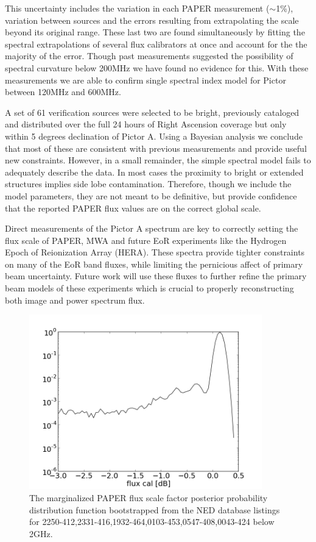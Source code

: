 \documentclass[preprint]{aastex}
\begin{document}
This uncertainty includes the 
variation in each PAPER measurement ($\sim$1\%), variation between sources and the errors resulting
from extrapolating the \citet{Baars:1977p9678} scale beyond its original range. These last
two are found simultaneously by fitting the spectral extrapolations of several flux calibrators
at once and account for the the majority of the error. Though past measurements suggested the possibility
of spectral curvature below 200MHz we have found no evidence for this.  With these measurements we are able 
to confirm single spectral index model for Pictor between 120MHz and 600MHz.

A set of  61 verification sources were selected to be bright, previously cataloged
and  distributed over
the full 24 hours of Right Ascension coverage but only within 5 degrees
declination of Pictor A.  Using a Bayesian analysis we conclude that most of
these are consistent with previous measurements and provide useful new
constraints. However, in a small remainder, the simple spectral model fails to
adequately describe the data. In most cases the proximity to bright or extended
structures implies side lobe contamination.  Therefore, though we include the
model parameters, they are not meant to be definitive, but provide confidence
that the reported PAPER flux values are on the correct global scale.


Direct measurements of the Pictor A spectrum are key to correctly setting the
flux scale of PAPER, MWA and future EoR experiments like the Hydrogen Epoch of Reionization Array (HERA).
These spectra provide tighter constraints on many of the EoR band fluxes, while
limiting the pernicious affect of primary beam uncertainty.  Future work will use these
fluxes to further  refine the primary beam models of these experiments which is crucial to properly reconstructing
both image and power spectrum flux.


\begin{figure}
\centering
\includegraphics[width=0.9\textwidth]{plots/2250-412_2331-416_1932-464_0103-453_0547-408_0043-424_gain_mcmc_chain_gain_conf.png}
\caption{
The marginalized PAPER flux scale factor posterior probability distribution
function bootstrapped from the NED database listings for
2250-412,2331-416,1932-464,0103-453,0547-408,0043-424 below 2GHz.
\label{fig:gain}}
\end{figure}
\end{document}
